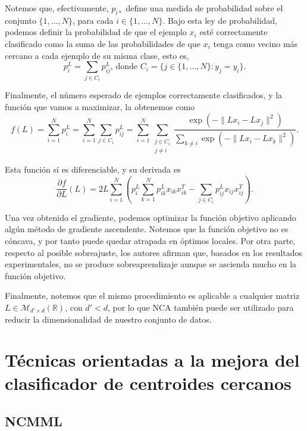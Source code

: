Notemos que, efectivamente, $p_{i*}$ define una medida de probabilidad sobre el conjunto $\{1,\dots,N\}$, para cada $i \in \{1,\dots,N\}$. Bajo esta ley de probabilidad, podemos definir la probabilidad de que el ejemplo $x_i$ esté correctamente clasificado como la suma de las probabilidades de que $x_i$ tenga como vecino más cercano a cada ejemplo de su misma clase, esto es,
\begin{equation}
    p_i^L = \sum_{j \in C_i} p_{ij}^L \text{, donde } C_i = \{j \in \{1,\dots,N\}\colon y_j = y_i\}.
\end{equation}

Finalmente, el número esperado de ejemplos correctamente clasificados, y la función que vamos a maximizar, la obtenemos como
\begin{equation}
    f(L) = \sum_{i=1}^N p_i^L = \sum_{i=1}^N \sum_{j \in C_i} p_{ij}^L = \sum_{i=1}^N \sum_{\substack{j \in C_i \\ j \ne i}} \frac{\exp\left(-\|Lx_i - Lx_j \|^2\right)}{\sum\limits_{k \ne i} \exp\left( -\|Lx_i - Lx_k\|^2 \right)}.
\end{equation}

Esta función sí es diferenciable, y su derivada es
\begin{equation}
    \frac{\partial f}{\partial L}(L) = 2L \sum_{i=1}^N \left( p_i^L \sum_{k=1}^N p_{ik}^L x_{ik}x_{ik}^T - \sum_{j \in C_i} p_{ij}^Lx_{ij}x_{ij}^T \right).
\end{equation}

Una vez obtenido el gradiente, podemos optimizar la función objetivo aplicando algún método de gradiente ascendente. Notemos que la función objetivo no es cóncava, y por tanto puede quedar atrapada en óptimos locales. Por otra parte, respecto al posible sobreajuste, los autores afirman que, basados en los resultados experimentales, no se produce sobreaprendizaje aunque se ascienda mucho en la función objetivo.

Finalmente, notemos que el mismo procedimiento es aplicable a cualquier matriz $L \in \mathcal{M}_{d'\times d}(\mathbb{R})$, con $d' < d$, por lo que NCA también puede ser utilizado para reducir la dimensionalidad de nuestro conjunto de datos.


\section{Técnicas orientadas a la mejora del clasificador de centroides cercanos}

\subsection{NCMML}

